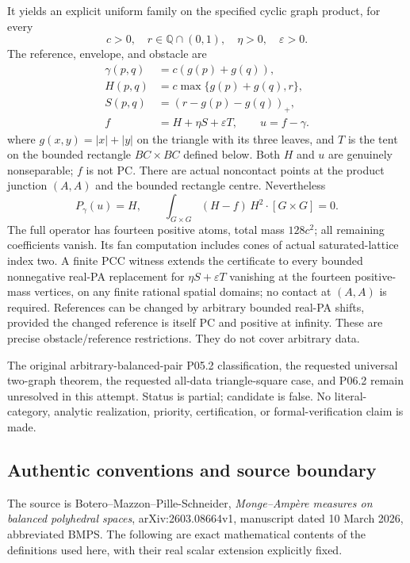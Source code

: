 \documentclass[
  10pt,
]{article}
\begin{document}
It yields an explicit uniform family on the specified cyclic graph
product, for every \[
 c>0,\quad r\in\mathbb Q\cap(0,1),\quad\eta>0,\quad\varepsilon>0.
\] The reference, envelope, and obstacle are \[
 \begin{aligned}
 \gamma(p,q)&=c(g(p)+g(q)),\\
 H(p,q)&=c\max\{g(p)+g(q),r\},\\
 S(p,q)&=(r-g(p)-g(q))_+,\\
 f&=H+\eta S+\varepsilon T,\qquad u=f-\gamma.
 \end{aligned}                                                \tag{1}
\] where \(g(x,y)=|x|+|y|\) on the triangle with its three leaves, and
\(T\) is the tent on the bounded rectangle \(BC\times BC\) defined
below. Both \(H\) and \(u\) are genuinely nonseparable; \(f\) is not PC.
There are actual noncontact points at the product junction \((A,A)\) and
the bounded rectangle centre. Nevertheless \[
 P_\gamma(u)=H,\qquad
 \int_{G\times G}(H-f)\,H^2\cdot[G\times G]=0.                \tag{2}
\] The full operator has fourteen positive atoms, total mass \(128c^2\);
all remaining coefficients vanish. Its fan computation includes cones of
actual saturated-lattice index two. A finite PCC witness extends the
certificate to every bounded nonnegative real-PA replacement for
\(\eta S+\varepsilon T\) vanishing at the fourteen positive-mass
vertices, on any finite rational spatial domains; no contact at
\((A,A)\) is required. References can be changed by arbitrary bounded
real-PA shifts, provided the changed reference is itself PC and positive
at infinity. These are precise obstacle/reference restrictions. They do
not cover arbitrary data.

The original arbitrary-balanced-pair P05.2 classification, the requested
universal two-graph theorem, the requested all-data triangle-square
case, and P06.2 remain unresolved in this attempt. Status is partial;
candidate is false. No literal-category, analytic realization, priority,
certification, or formal-verification claim is made.

\subsection{Authentic conventions and source
boundary}\label{authentic-conventions-and-source-boundary}

The source is Botero--Mazzon--Pille-Schneider, \emph{Monge--Ampère
measures on balanced polyhedral spaces}, arXiv:2603.08664v1, manuscript
dated 10 March 2026, abbreviated BMPS. The following are exact
mathematical contents of the definitions used here, with their real
scalar extension explicitly fixed.
\end{document}
